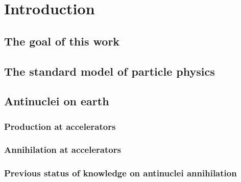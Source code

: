 \section{Introduction}

\subsection{The goal of this work}

\subsection{The standard model of particle physics}




\subsection{Antinuclei on earth}
\subsubsection{Production at accelerators}
\subsubsection{Annihilation at accelerators}
\subsubsection{Previous status of knowledge on antinuclei annihilation}

